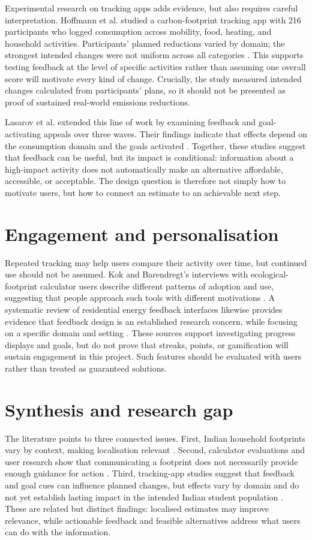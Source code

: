 \documentclass[10pt,a4paper,twocolumn]{article}
\begin{document}
Experimental research on tracking apps adds evidence, but also requires careful interpretation. Hoffmann et al. studied a carbon-footprint tracking app with 216 participants who logged consumption across mobility, food, heating, and household activities. Participants' planned reductions varied by domain; the strongest intended changes were not uniform across all categories \cite{hoffmann2024}. This supports testing feedback at the level of specific activities rather than assuming one overall score will motivate every kind of change. Crucially, the study measured intended changes calculated from participants' plans, so it should not be presented as proof of sustained real-world emissions reductions.

Lasarov et al. extended this line of work by examining feedback and goal-activating appeals over three waves. Their findings indicate that effects depend on the consumption domain and the goals activated \cite{lasarov2024}. Together, these studies suggest that feedback can be useful, but its impact is conditional: information about a high-impact activity does not automatically make an alternative affordable, accessible, or acceptable. The design question is therefore not simply how to motivate users, but how to connect an estimate to an achievable next step.

\section{Engagement and personalisation}
Repeated tracking may help users compare their activity over time, but continued use should not be assumed. Kok and Barendregt's interviews with ecological-footprint calculator users describe different patterns of adoption and use, suggesting that people approach such tools with different motivations \cite{kok2021}. A systematic review of residential energy feedback interfaces likewise provides evidence that feedback design is an established research concern, while focusing on a specific domain and setting \cite{chatzigeorgiou2021}. These sources support investigating progress displays and goals, but do not prove that streaks, points, or gamification will sustain engagement in this project. Such features should be evaluated with users rather than treated as guaranteed solutions.

\section{Synthesis and research gap}
The literature points to three connected issues. First, Indian household footprints vary by context, making localisation relevant \cite{lee2021}. Second, calculator evaluations and user research show that communicating a footprint does not necessarily provide enough guidance for action \cite{mulrow2019,collins2020}. Third, tracking-app studies suggest that feedback and goal cues can influence planned changes, but effects vary by domain and do not yet establish lasting impact in the intended Indian student population \cite{hoffmann2024,lasarov2024}. These are related but distinct findings: localised estimates may improve relevance, while actionable feedback and feasible alternatives address what users can do with the information.
\end{document}
